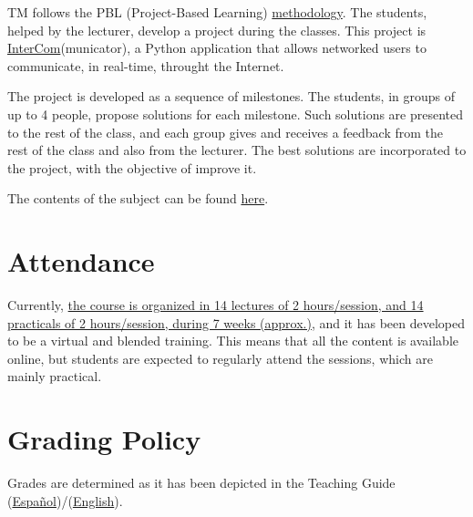 TM follows the PBL (Project-Based Learning)
\href{http://portafirma.ual.es/pfirma/downloadReport/file?idDocument=4u61Ie5es2&idRequest=ZeBY35LlFa}{methodology}. The
students, helped by the lecturer, develop a project during the
classes. This project is
\href{https://github.com/Tecnologias-multimedia/intercom}{InterCom}(municator),
a Python application that allows networked users to communicate, in
real-time, throught the Internet.

The project is developed as a sequence of milestones. The students, in
groups of up to 4 people, propose solutions for each milestone. Such
solutions are presented to the rest of the class, and each group gives
and receives a feedback from the rest of the class and also from the
lecturer. The best solutions are incorporated to the project, with the
objective of improve it.

The contents of the subject can be found \href{https://tecnologias-multimedia.github.io/contents/}{here}.

\section{Attendance}

Currently,
\href{https://www.ual.es/estudios/grados/presentacion/plandeestudios/asignatura/4015/40154321}{the
  course is organized in 14 lectures of 2 hours/session, and 14
  practicals of 2 hours/session, during 7 weeks (approx.)}, and it
has been developed to be a virtual and blended training. This means
that all the content is available online, but students are expected to
regularly attend the sessions, which are mainly practical.

\section{Grading Policy}

Grades are determined as it has been depicted in the Teaching Guide
(\href{https://portafirma.ual.es/pfirma/downloadReport/file?idDocument=4Jp82utmug&idRequest=QY36GYcOZQ}{Español})/(\href{https://portafirma.ual.es/pfirma/downloadReport/file?idDocument=Zcmom6qigD&idRequest=xXgueuk9oD}{English}).
